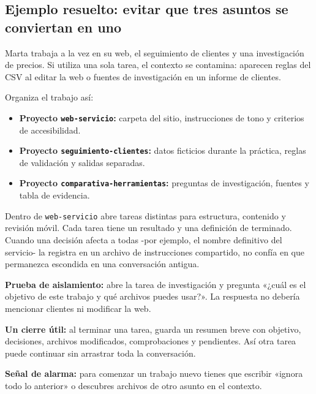 \documentclass[10pt,a4paper,openany]{book}
\providecommand{\tightlist}{\setlength{\itemsep}{0.18em}\setlength{\parskip}{0pt}}
\begin{document}
\subsection{Ejemplo resuelto: evitar que tres asuntos se conviertan en
uno}\label{ejemplo-resuelto-evitar-que-tres-asuntos-se-conviertan-en-uno}

Marta trabaja a la vez en su web, el seguimiento de clientes y una
investigación de precios. Si utiliza una sola tarea, el contexto se
contamina: aparecen reglas del CSV al editar la web o fuentes de
investigación en un informe de clientes.

Organiza el trabajo así:

\begin{itemize}
\tightlist
\item
  \textbf{Proyecto \texttt{web-servicio}:} carpeta del sitio,
  instrucciones de tono y criterios de accesibilidad.
\item
  \textbf{Proyecto \texttt{seguimiento-clientes}:} datos ficticios
  durante la práctica, reglas de validación y salidas separadas.
\item
  \textbf{Proyecto \texttt{comparativa-herramientas}:} preguntas de
  investigación, fuentes y tabla de evidencia.
\end{itemize}

Dentro de \texttt{web-servicio} abre tareas distintas para estructura,
contenido y revisión móvil. Cada tarea tiene un resultado y una
definición de terminado. Cuando una decisión afecta a todas -por
ejemplo, el nombre definitivo del servicio- la registra en un archivo de
instrucciones compartido, no confía en que permanezca escondida en una
conversación antigua.

\begin{tipbox}

\textbf{Prueba de aislamiento:} abre la tarea de investigación y
pregunta «¿cuál es el objetivo de este trabajo y qué archivos puedes
usar?». La respuesta no debería mencionar clientes ni modificar la web.

\end{tipbox}

\textbf{Un cierre útil:} al terminar una tarea, guarda un resumen breve
con objetivo, decisiones, archivos modificados, comprobaciones y
pendientes. Así otra tarea puede continuar sin arrastrar toda la
conversación.

\begin{warningbox}

\textbf{Señal de alarma:} para comenzar un trabajo nuevo tienes que
escribir «ignora todo lo anterior» o descubres archivos de otro asunto
en el contexto.

\end{warningbox}
\end{document}
